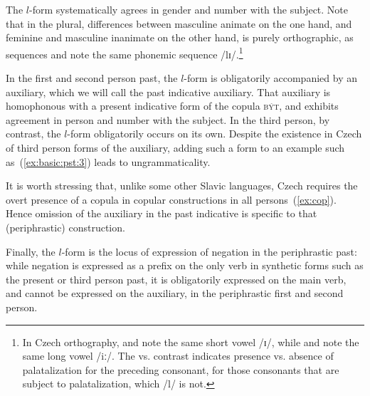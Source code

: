 \documentclass[output=paper]{langsci/langscibook}
\begin{document}
The $l$-form systematically agrees in gender and number with the subject. Note that in the plural, differences between  masculine animate on the one hand, and feminine and masculine inanimate on the other hand, is purely orthographic, as sequences  and  note the same phonemic sequence /lɪ/.\footnote{In Czech orthography,  and  note the same short vowel /ɪ/, while  and  note the same long vowel /iː/. The  vs.  contrast indicates presence vs. absence of palatalization for the preceding consonant, for those consonants that are subject to palatalization, which /l/ is not.}


In the first and second person past, the $l$-form is obligatorily accompanied by an auxiliary, which we will call the past indicative auxiliary. That auxiliary is homophonous with a present indicative form of the copula \textsc{být}, and exhibits agreement in person and number with the subject. In the third person, by contrast, the $l$-form obligatorily occurs on its own. Despite the existence in Czech of third person forms of the auxiliary, adding such a form to an example such as~(\ref{ex:basic:pst:3}) leads to ungrammaticality. 

\begin{exe}
\end{exe}

It is worth stressing that, unlike some other Slavic languages, Czech requires the overt presence of a copula in copular constructions in all persons~(\ref{ex:cop}). Hence omission of the auxiliary in the past indicative is specific to that (periphrastic) construction.

\begin{exe}
\ex\label{ex:cop}\begin{xlist}
\end{xlist}
\end{exe}

Finally, the $l$-form is the locus of expression of negation in the periphrastic past: while negation is expressed as a prefix on the only verb in synthetic forms such as the present or third person past, it is obligatorily expressed on the main verb, and cannot be expressed on the auxiliary, in the periphrastic first and second person.
\end{document}

